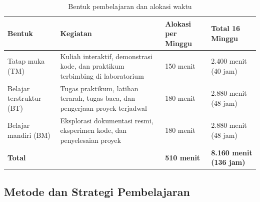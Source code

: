 \begin{table}[htbp]
\centering
\caption{Bentuk pembelajaran dan alokasi waktu}
\label{tab:alokasi}
\begin{tabularx}{\textwidth}{@{}L{3.4cm} Y C{2.6cm} C{3.2cm}@{}}
\toprule
\headrow \textbf{Bentuk} & \textbf{Kegiatan} & \textbf{Alokasi per Minggu} & \textbf{Total 16 Minggu} \\
\midrule
Tatap muka (TM)        & Kuliah interaktif, demonstrasi kode, dan praktikum terbimbing di laboratorium & 150 menit & 2.400 menit (40 jam) \\
Belajar terstruktur (BT) & Tugas praktikum, latihan terarah, tugas baca, dan pengerjaan proyek terjadwal & 180 menit & 2.880 menit (48 jam) \\
Belajar mandiri (BM)   & Eksplorasi dokumentasi resmi, eksperimen kode, dan penyelesaian proyek & 180 menit & 2.880 menit (48 jam) \\
\midrule
\textbf{Total}         & & \textbf{510 menit} & \textbf{8.160 menit (136 jam)} \\
\bottomrule
\end{tabularx}
\end{table}

\subsection{Metode dan Strategi Pembelajaran}


